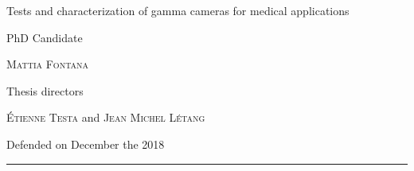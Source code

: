 \begin{titlepage}

\noindent
\textcolor{titlepagecolor}{\titlefont Tests and characterization \newline of gamma
cameras for \newline medical applications}\par
\epigraph{PhD Candidate}%
{\textsc{Mattia Fontana}}

\epigraph{Thesis directors}%
{\textsc{\'{E}tienne Testa} and \textsc{Jean Michel L\'{e}tang}}
\null\vfill
\vspace*{1cm}
\noindent
\hfill
\begin{minipage}{0.35\linewidth}
    \begin{flushright}
        \printuniv 
        Defended on December the  2018
    \end{flushright}
\end{minipage}
%
\begin{minipage}{0.02\linewidth}
    \rule{1pt}{125pt}
\end{minipage}
\titlepagedecoration
\end{titlepage}

